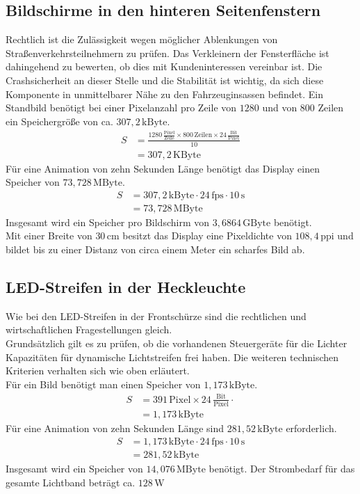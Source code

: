 \subsection{Bildschirme in den hinteren Seitenfenstern}
Rechtlich ist die Zulässigkeit wegen möglicher Ablenkungen von Straßenverkehrsteilnehmern zu prüfen.
Das Verkleinern der Fensterfläche ist dahingehend zu bewerten, ob dies mit Kundeninteressen vereinbar ist.
Die Crashsicherheit an dieser Stelle und die Stabilität ist wichtig, da sich diese Komponente in unmittelbarer Nähe zu den Fahrzeuginsassen befindet.
Ein Standbild benötigt bei einer Pixelanzahl pro Zeile von $ 1280 $ und von $ 800 $ Zeilen ein Speichergröße von ca. $ 307,2\,\mathrm{kByte}$. 
\begin{align}
	S &= \frac{1280\,\frac{\mathrm{Pixel}}{\mathrm{Zeile}}\times 800\,\mathrm{Zeilen} \times 24\,\frac{\mathrm{Bit}}{\mathrm{Pixel}}}{10} \\
	&= 307,2\,\mathrm{KByte}
\end{align}
Für eine Animation von zehn Sekunden Länge benötigt das Display einen Speicher von $ 73,728\,\mathrm{MByte}$.
\begin{align}
	S &= 307,2\,\mathrm{kByte} \cdot 24\,\mathrm{fps} \cdot 10\,\mathrm{s}\\
	&= 73,728\,\mathrm{MByte}
\end{align}
Insgesamt wird ein Speicher pro Bildschirm von $ 3,6864\,\mathrm{GByte} $ benötigt. \\
Mit einer Breite von $ 30\,\mathrm{cm} $ besitzt das Display eine Pixeldichte von $ 108,4\,\mathrm{ppi} $ und bildet bis zu einer Distanz von circa einem Meter ein scharfes Bild ab.
\subsection{LED-Streifen in der Heckleuchte}
Wie bei den LED-Streifen in der Frontschürze sind die rechtlichen und wirtschaftlichen Fragestellungen gleich. \\
Grundsätzlich gilt es zu prüfen, ob die vorhandenen Steuergeräte für die Lichter Kapazitäten für dynamische Lichtstreifen frei haben.
Die weiteren technischen Kriterien verhalten sich wie oben erläutert. \\
Für ein Bild benötigt man einen Speicher von $ 1,173\,\mathrm{kByte} $.
\begin{align}
	S &= 391\,\mathrm{Pixel} \times 24\,\frac{\mathrm{Bit}}{\mathrm{Pixel}} \cdot \\
	&= 1,173\,\mathrm{kByte}
\end{align}
Für eine Animation von zehn Sekunden Länge sind $ 281,52\,\mathrm{kByte} $ erforderlich.
\begin{align}
	S &= 1,173\,\mathrm{kByte} \cdot 24\,\mathrm{fps} \cdot 10\,\mathrm{s} \\
	&= 281,52\,\mathrm{kByte}
\end{align}
Insgesamt wird ein Speicher von $ 14,076\,\mathrm{MByte} $ benötigt.
Der Strombedarf für das gesamte Lichtband beträgt ca. $ 128\,\mathrm{W} $
